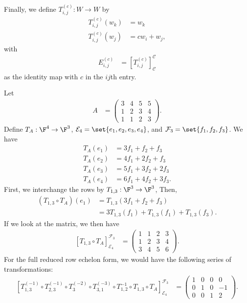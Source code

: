 \documentclass[10pt]{mypackage}
\begin{document}
Finally, we define $T_{i,j}^{(c)}:W\rightarrow W$ by
\begin{align*}
  T_{i,j}^{(c)}\left(w_k\right) &= w_k\tag*{$k\neq j$}\\
  T_{i,j}^{(c)}\left(w_j\right) &= cw_i + w_j,
\end{align*}
with
\begin{align*}
  E_{i,j}^{(c)} &= \left[T_{i,j}^{(c)}\right]_{\mathcal{C}}^{\mathcal{C}}
\end{align*}
as the identity map with $c$ in the $ij$th entry.
\begin{example}
  Let 
  \begin{align*}
    A &= \begin{pmatrix}3 & 4 & 5 & 5\\ 1 & 2 & 3 & 4 \\ 1 & 1 & 2 & 3\end{pmatrix}.
  \end{align*}
  Define $T_A: \F^4\rightarrow \F^3$, $\mathcal{E}_4 = \set{e_1,e_2,e_3,e_4}$, and $\mathcal{F}_3 = \set{f_1,f_2,f_3}$. We have
  \begin{align*}
    T_A\left(e_1\right) &= 3f_1 + f_2 + f_3\\
    T_A\left(e_2\right) &= 4f_1 + 2f_2 + f_3\\
    T_A\left(e_3\right) &= 5f_1 + 3f_2 + 2f_3\\
    T_A\left(e_4\right) &= 6f_1 + 4f_2 + 3f_3.
  \end{align*}
  First, we interchange the rows by $T_{1,3}:\F^3\rightarrow \F^3$, Then,
  \begin{align*}
    \left(T_{1,3}\circ T_A\right)\left(e_1\right) &= T_{1,3}\left(3f_1 + f_2 + f_3\right)\\
                                                  &= 3T_{1,3}\left(f_1\right) + T_{1,3}\left(f_1\right) + T_{1,3}\left(f_3\right).
  \end{align*}
  If we look at the matrix, we then have
  \begin{align*}
    \left[T_{1,3}\circ T_A\right]_{\mathcal{E}_4}^{\mathcal{F}_3} &= \begin{pmatrix}1 & 1 & 2 & 3 \\ 1 & 2 & 3 & 4 \\ 3 & 4 & 5 & 6\end{pmatrix}.
  \end{align*}
  For the full reduced row echelon form, we would have the following series of transformations:
  \begin{align*}
    \left[T_{1,3}^{(-1)}\circ T_{2,3}^{(-1)}\circ T_{3}^{(-2)}\circ T_{3,1}^{(-3)}\circ T_{1,2}^{-1}\circ T_{1,3}\circ T_A\right]_{\mathcal{E}_4}^{\mathcal{F}_3} &= \begin{pmatrix}1 & 0 & 0 & 0 \\ 0 & 1 & 0  & -1\\ 0 & 0 & 1 & 2\end{pmatrix}.
  \end{align*}
\end{example}
\end{document}
